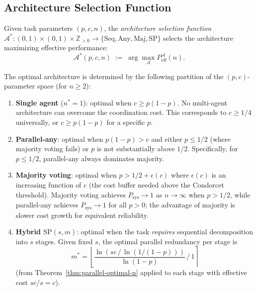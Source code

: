 \subsection{Architecture Selection Function}
\label{subsec:arch-selection}

\begin{definition}
\label{def:arch-selection}
Given task parameters $(p, c, n)$, the \emph{architecture selection function}
$\mathcal{A}^* : (0,1) \times (0,1) \times \mathbb{Z}_{>0} \to
\{\mathrm{Seq}, \mathrm{Any}, \mathrm{Maj}, \mathrm{SP}\}$
selects the architecture maximizing effective performance:
\[
  \mathcal{A}^*(p, c, n) \;:=\; \arg\max_{\mathcal{A}}
    P_{\mathrm{eff}}^{\mathcal{A}}(n).
\]
\end{definition}

\begin{theorem}
\label{thm:arch-selection}
The optimal architecture is determined by the following partition of the
$(p, c)$-parameter space (for $n \geq 2$):
\begin{enumerate}
  \item \textbf{Single agent} ($n^* = 1$): optimal when $c \geq p(1-p)$. No
    multi-agent architecture can overcome the coordination cost. This corresponds
    to $c \geq 1/4$ universally, or $c \geq p(1-p)$ for a specific $p$.

  \item \textbf{Parallel-any}: optimal when $p(1-p) > c$ and either $p \leq 1/2$
    (where majority voting fails) or $p$ is not substantially above $1/2$.
    Specifically, for $p \leq 1/2$, parallel-any always dominates majority.

  \item \textbf{Majority voting}: optimal when $p > 1/2 + \epsilon(c)$ where
    $\epsilon(c)$ is an increasing function of $c$ (the cost buffer needed above
    the Condorcet threshold). Majority voting achieves $P_{\mathrm{sys}} \to 1$
    as $n \to \infty$ when $p > 1/2$, while parallel-any achieves
    $P_{\mathrm{sys}} \to 1$ for all $p > 0$; the advantage of majority is
    slower cost growth for equivalent reliability.

  \item \textbf{Hybrid $\mathrm{SP}(s,m)$}: optimal when the task \emph{requires}
    sequential decomposition into $s$ stages. Given fixed $s$, the optimal
    parallel redundancy per stage is
    \[
      m^* = \left\lfloor \frac{\ln(sc \,/\, \ln(1/(1-p)))}{\ln(1-p)}
        \,/\, 1 \right\rceil
    \]
    (from Theorem~\ref{thm:parallel-optimal-n} applied to each stage with
    effective cost $sc / s = c$).
\end{enumerate}
\end{theorem}

